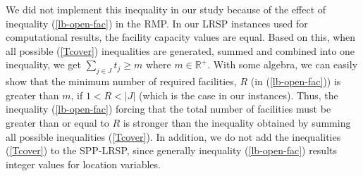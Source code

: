We did not implement this inequality in our study because of the effect of
inequality (\ref{lb-open-fac}) in the RMP. In our LRSP instances used for
computational results, the facility capacity values are equal. Based on this, when all
possible (\ref{Tcover}) inequalities are generated, summed  and combined
into one inequality, we get $\sum_{j \in J}t_j \geq m$ where $m \in \mathbb{R}^+$.
With some algebra, we can easily show that the minimum number of required
facilities, $R$ (in (\ref{lb-open-fac})) is greater than $m$, if $1 < R < |J|$
(which is the case in our instances). Thus, the inequality (\ref{lb-open-fac})
forcing that the total number of facilities must be greater than or equal to
$R$ is stronger than the inequality obtained by summing all possible inequalities
(\ref{Tcover}). In addition, we do not add the inequalities (\ref{Tcover})
to the SPP-LRSP, since generally inequality (\ref{lb-open-fac}) results
integer values for location variables.

